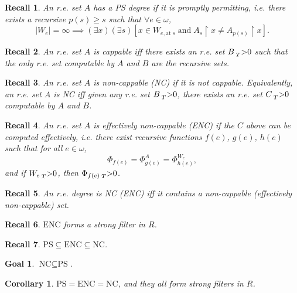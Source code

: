\documentclass{article}
\newtheorem{recall}{Recall}[subsection]
\newtheorem{goal}{Goal}[subsection]
\newtheorem{corollary}{Corollary}[subsection]
\begin{document}
  \begin{recall}
    An r.e. set $A$ has a PS degree if it is promptly permitting, i.e.
    there exists a recursive $p(s)\geq s$ such that $\forall e\in\omega$,
    \[|W_e|=\infty \implies (\exists x)(\exists s) [x\in W_{e, \text{at}\;
    s}\; \text{and}\; A_s\restriction x \neq A_{p(s)}\restriction x].\]
  \end{recall}

  \begin{recall}
    An r.e. set $A$ is cappable iff there exists an r.e. set
    $B\prescript{}{T}{>}0$ such that the only r.e. set computable by $A$
    and $B$ are the recursive sets.
  \end{recall}

  \begin{recall}
    An r.e. set $A$ is non-cappable (NC) if it is not cappable.
    Equivalently, an r.e. set $A$ is NC iff given any r.e. set
    $B\prescript{}{T}{>}0$, there exists an r.e. set $C\prescript{}{T}{>}0$
    computable by $A$ and $B$.
  \end{recall}

  \begin{recall}
    An r.e. set $A$ is effectively non-cappable (ENC) if the $C$ above can
    be computed effectively, i.e. there exist recursive functions
    $f(e)$, $g(e)$, $h(e)$ such that for all $e\in\omega$,
    \[\Phi_{f(e)} =\Phi_{g(e)}^A =\Phi_{h(e)}^{W_e},\]
    and if $W_e\prescript{}{T}{>}0$, then $\Phi_{f(e)}\prescript{}{T}{>}0$.
  \end{recall}

  \begin{recall}
    An r.e. degree is NC (ENC) iff it contains a non-cappable (effectively
    non-cappable) set.
  \end{recall}

  \begin{recall}
    $\text{ENC}$ forms a strong filter in $R$.
  \end{recall}

  \begin{recall}
    $\text{PS} \subseteq \text{ENC} \subseteq \text{NC}$.
  \end{recall}

  \begin{goal}
    $\text{NC} \subseteq \text{PS}$.
  \end{goal}

  \begin{corollary}
    $\text{PS}=\text{ENC}=\text{NC}$, and they all form strong filters in
    $R$.
  \end{corollary}
\end{document}
